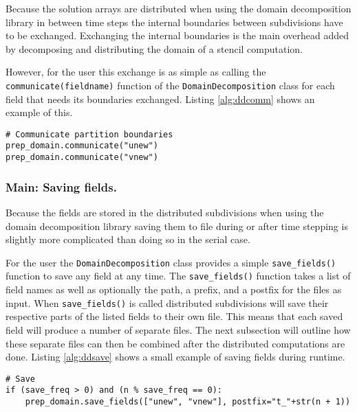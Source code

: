 Because the solution arrays are distributed when using the domain decomposition library in between time steps the internal boundaries between subdivisions have to be exchanged.
Exchanging the internal boundaries is the main overhead added by decomposing and distributing the domain of a stencil computation.

However, for the user this exchange is as simple as calling the \texttt{communicate(fieldname)} function of the \texttt{DomainDecomposition} class for each field that needs its boundaries exchanged.
Listing \ref{alg:ddcomm} shows an example of this.

\begin{lstlisting}[caption={Example calling for internal boundary exchange of two fields in the domain decomposition libarary},captionpos=b, label={alg:ddcomm}, float, floatplacement=H]
# Communicate partition boundaries
prep_domain.communicate("unew")
prep_domain.communicate("vnew")
\end{lstlisting}

\subsubsection{Main: Saving fields.}
Because the fields are stored in the distributed subdivisions when using the domain decomposition library saving them to file during or after time stepping is slightly more complicated than doing so in the serial case.

For the user the \texttt{DomainDecomposition} class provides a simple \texttt{save\_fields()} function to save any field at any time.
The \texttt{save\_fields()} function takes a list of field names as well as optionally the path, a prefix, and a postfix for the files as input.
When \texttt{save\_fields()} is called distributed subdivisions will save their respective parts of the listed fields to their own file.
This means that each saved field will produce a number of separate files.
The next subsection will outline how these separate files can then be combined after the distributed computations are done.
Listing \ref{alg:ddsave} shows a small example of saving fields during runtime.

\begin{lstlisting}[caption={Example calling to save two fields during time stepping using the domain decomposition libarary},captionpos=b, label={alg:ddsave}, float, floatplacement=H]
# Save
if (save_freq > 0) and (n % save_freq == 0):
    prep_domain.save_fields(["unew", "vnew"], postfix="t_"+str(n + 1))
\end{lstlisting}

